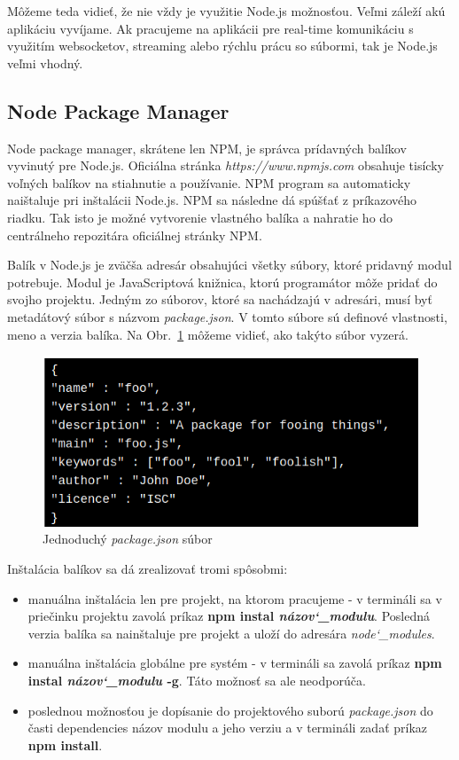 \indent Môžeme teda vidieť, že nie vždy je využitie Node.js možnosťou. Veľmi záleží akú aplikáciu vyvíjame. Ak pracujeme na aplikácii pre real-time komunikáciu s využitím websocketov, streaming alebo rýchlu prácu so súbormi, tak je Node.js veľmi vhodný. 

\subsection{Node Package Manager}
\indent Node package manager, skrátene len NPM, je správca prídavných balíkov vyvinutý pre Node.js. Oficiálna stránka \textit{https://www.npmjs.com} obsahuje tisícky voľných balíkov na stiahnutie a používanie. NPM program sa automaticky naištaluje pri inštalácii Node.js. NPM sa následne dá spúšťať z príkazového riadku. Tak isto je možné vytvorenie vlastného balíka a nahratie ho do centrálneho repozitára oficiálnej stránky NPM.

\indent Balík v Node.js je zväčša adresár obsahujúci všetky súbory, ktoré pridavný modul potrebuje. Modul je JavaScriptová knižnica, ktorú programátor môže pridať do svojho projektu. Jedným zo súborov, ktoré sa nachádzajú v adresári, musí byť metadátový súbor s názvom \textit{package.json}. V tomto súbore sú definové vlastnosti, meno a verzia balíka. Na Obr.~\ref{fig:package} môžeme vidieť, ako takýto súbor vyzerá\cite{npm,npm_node}.  

\begin{figure}[H]
    \centering
    \includegraphics[scale=0.55]{img/package.png}
    \caption{Jednoduchý \textit{package.json} súbor\cite{npm}}
    \label{fig:package}
\end{figure}

Inštalácia balíkov sa dá zrealizovať tromi spôsobmi:
\begin{itemize}
    \item manuálna inštalácia len pre projekt, na ktorom pracujeme - v termináli sa v priečinku projektu zavolá príkaz \textbf{npm instal \textit{názov\char`_modulu}}. Posledná verzia balíka sa nainštaluje pre projekt a uloží do adresára \textit{node\char`_modules}.
    \item manuálna inštalácia globálne pre systém - v termináli sa zavolá príkaz \textbf{npm instal \textit{názov\char`_modulu} -g}. Táto možnosť sa ale neodporúča.
    \item poslednou možnosťou je dopísanie do projektového suború \textit{package.json} do časti dependencies názov modulu a jeho verziu a v termináli zadať príkaz \textbf{npm install}.
\end{itemize}

